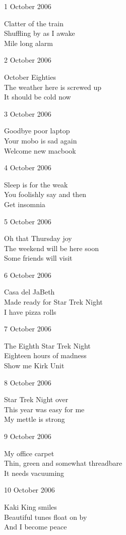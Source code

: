 \documentclass[12pt]{article}
\begin{document}
\setlength{\parskip}{1mm}

1 October 2006

Clatter of the train \\
Shuffling by as I awake \\
Mile long alarm


\newpage

2 October 2006

October Eighties \\
The weather here is screwed up \\
It should be cold now

3 October 2006

Goodbye poor laptop \\
Your mobo is sad again \\
Welcome new macbook

4 October 2006

Sleep is for the weak \\
You foolishly say and then \\
Get insomnia

5 October 2006

Oh that Thursday joy \\
The weekend will be here soon \\
Some friends will visit

6 October 2006

Casa del JaBeth \\
Made ready for Star Trek Night \\
I have pizza rolls

7 October 2006

The Eighth Star Trek Night \\
Eighteen hours of madness \\
Show me Kirk Unit



\newpage

8 October 2006

Star Trek Night over \\
This year was easy for me \\
My mettle is strong

9 October 2006

My office carpet \\
Thin, green and somewhat threadbare \\
It needs vacuuming

10 October 2006

Kaki King smiles \\
Beautiful tunes float on by \\
And I become peace
\end{document}
